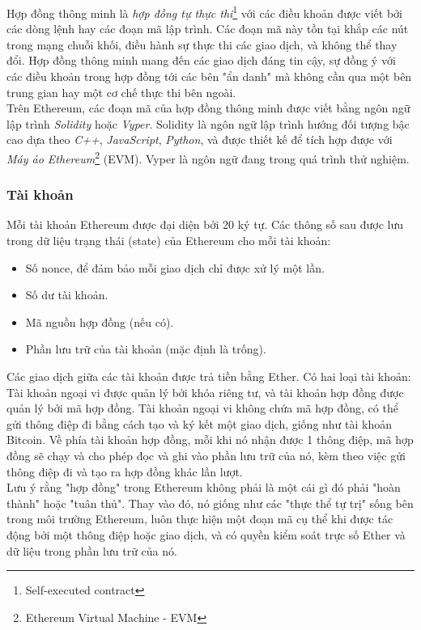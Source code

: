 Hợp đồng thông minh là \textit{hợp đồng tự thực thi}\footnote{Self-executed contract} với các điều khoản được viết bởi các dòng lệnh hay các đoạn mã lập trình. Các đoạn mã này tồn tại khắp các nút trong mạng chuỗi khối, điều hành sự thực thi các giao dịch, và không thể thay đổi. Hợp đồng thông minh mang đến các giao dịch đáng tin cậy, sự đồng ý với các điều khoản trong hợp đồng tới các bên "ẩn danh" mà không cần qua một bên trung gian hay một cơ chế thực thi bên ngoài.\\

Trên Ethereum, các đoạn mã của hợp đồng thông minh được viết bằng ngôn ngữ lập trình \textit{Solidity} hoặc \textit{Vyper}. Solidity là ngôn ngữ lập trình hướng đối tượng bậc cao dựa theo \textit{C++}, \textit{JavaScript}, \textit{Python}, và được thiết kế để tích hợp được với \textit{Máy ảo Ethereum}\footnote{Ethereum Virtual Machine - EVM} (EVM). Vyper là ngôn ngữ đang trong quá trình thử nghiệm.

\subsubsection*{Tài khoản}

Mỗi tài khoản Ethereum được đại diện bởi 20 ký tự. Các thông số sau được lưu trong dữ liệu trạng thái (state) của Ethereum cho mỗi tài khoản:
\begin{itemize}
    \item Số nonce, để đảm bảo mỗi giao dịch chỉ được xử lý một lần.
    \item Số dư tài khoản.
    \item Mã nguồn hợp đồng (nếu có).
    \item Phần lưu trữ của tài khoản (mặc định là trống).
\end{itemize}

Các giao dịch giữa các tài khoản được trả tiền bằng Ether. Có hai loại tài khoản: Tài khoản ngoại vi được quản lý bởi khóa riêng tư, và tài khoản hợp đồng được quản lý bởi mã hợp đồng. Tài khoản ngoại vi không chứa mã hợp đồng, có thể gửi thông điệp đi bằng cách tạo và ký kết một giao dịch, giống như tài khoản Bitcoin. Về phía tài khoản hợp đồng, mỗi khi nó nhận được 1 thông điệp, mã hợp đồng sẽ chạy và cho phép đọc và ghi vào phần lưu trữ của nó, kèm theo việc gửi thông điệp đi và tạo ra hợp đồng khác lần lượt.\\

Lưu ý rằng "hợp đồng" trong Ethereum không phải là một cái gì đó phải "hoàn thành" hoặc "tuân thủ". Thay vào đó, nó giống như các "thực thể tự trị" sống bên trong môi trường Ethereum, luôn thực hiện một đoạn mã cụ thể khi được tác động bởi một thông điệp hoặc giao dịch, và có quyền kiểm soát trực số Ether và dữ liệu trong phần lưu trữ của nó.

